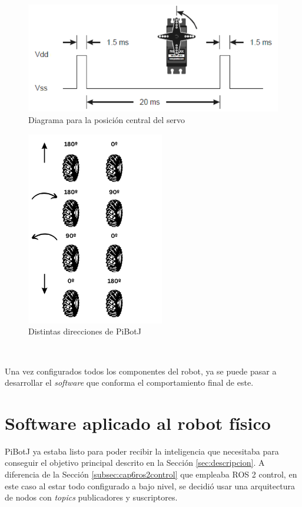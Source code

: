  \begin{figure} [h!]
	\begin{center}
		\includegraphics[width=12cm]{figs/cap6/pwm.png}
	\end{center}
	\caption{Diagrama para la posición central del servo}
	\label{fig:pwm}
\end{figure}

 \begin{figure} [h!]
	\begin{center}
		\includegraphics[width=6cm]{figs/cap6/motorlogic.png}
	\end{center}
	\caption{Distintas direcciones de PiBotJ}
	\label{fig:motorlogic}
\end{figure}\

Una vez configurados todos los componentes del robot, ya se puede pasar a desarrollar el \textit{software} que conforma el comportamiento final de este. 
 

\section{Software aplicado al robot físico}
\label{sec:softwarerf}

PiBotJ ya estaba listo para poder recibir la inteligencia que necesitaba para conseguir el objetivo principal descrito en la Sección \ref{sec:descripcion}. A diferencia de la Sección \ref{subsec:cap6ros2control} que empleaba ROS 2 control, en este caso al estar todo configurado a bajo nivel, se decidió usar una arquitectura de nodos con \textit{topics} publicadores y suscriptores.

